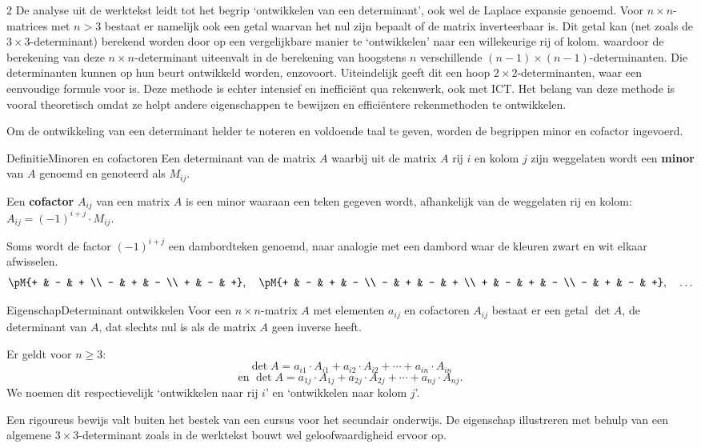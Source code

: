 \begin{multicols}{2}
De analyse uit de werktekst leidt tot het begrip `ontwikkelen van een determinant', ook wel de Laplace expansie genoemd. Voor $n \times n$-matrices met $n > 3$ bestaat er namelijk ook een getal waarvan het nul zijn bepaalt of de matrix inverteerbaar is. Dit getal kan (net zoals de $3 \times 3$-determinant) berekend worden door op een vergelijkbare manier te `ontwikkelen' naar een willekeurige rij of kolom. waardoor de berekening van deze $n\times n$-determinant uiteenvalt in de berekening van hoogstens $n$ verschillende $(n-1)\times (n-1)$-determinanten. Die determinanten kunnen op hun beurt ontwikkeld worden, enzovoort. Uiteindelijk geeft dit een hoop $2\times 2$-determinanten, waar een eenvoudige formule voor is. Deze methode is echter intensief en ineffici\"ent qua rekenwerk, ook met ICT. Het belang van deze methode is vooral theoretisch omdat ze helpt andere eigenschappen te bewijzen en efficiëntere rekenmethoden te ontwikkelen. 

Om de ontwikkeling van een determinant helder te noteren en voldoende taal te geven, worden de begrippen minor en cofactor ingevoerd.

\begin{kader}{Definitie}{Minoren en cofactoren}  
   Een determinant van de matrix $A$ waarbij uit de matrix $A$ rij $i$ en kolom $j$ zijn weggelaten wordt een \textbf{minor} van $A$ genoemd en genoteerd als $M_{ij}$. 

   Een \textbf{cofactor} $A_{ij}$ van een matrix $A$ is een minor waaraan een teken gegeven wordt, afhankelijk van de weggelaten rij en kolom: $A_{ij}=(-1)^{i+j}\cdot M_{ij}$.
\end{kader}
%
Soms wordt de factor $(-1)^{i+j}$ een dambordteken genoemd, naar analogie met een dambord waar de kleuren zwart en wit elkaar afwisselen. 
$$\pM{+ & - & + \\ - & + & - \\ + & - & +}, \quad \pM{+ & - & + & - \\ - & + & - & + \\ + & - & + & - \\ - & + & - & +},\quad \ldots$$
%
\begin{kader}{Eigenschap}{Determinant ontwikkelen}
    Voor een $n\times n$-matrix $A$ met elementen $a_{ij}$ en cofactoren $A_{ij}$ bestaat er een getal $\det A$, de determinant van $A$, dat slechts nul is als de matrix $A$ geen inverse heeft.
    
    Er geldt voor $n\ge 3$:
    $$\det A = a_{i1}\cdot A_{i1} + a_{i2}\cdot A_{i2} + \cdots + a_{in} \cdot A_{in} %
    $$
    $$\text{en } \det A = a_{1j}\cdot A_{1j} + a_{2j}\cdot A_{2j} + \cdots + a_{nj} \cdot A_{nj} %
    .$$ 
  We noemen dit respectievelijk `ontwikkelen naar rij $i$' en `ontwikkelen naar kolom $j$'.
\end{kader}
Een rigoureus bewijs valt buiten het bestek van een cursus voor het secundair onderwijs. De eigenschap illustreren met behulp van een algemene $3\times 3$-determinant zoals in de werktekst bouwt wel geloofwaardigheid ervoor op. 


\end{multicols}
